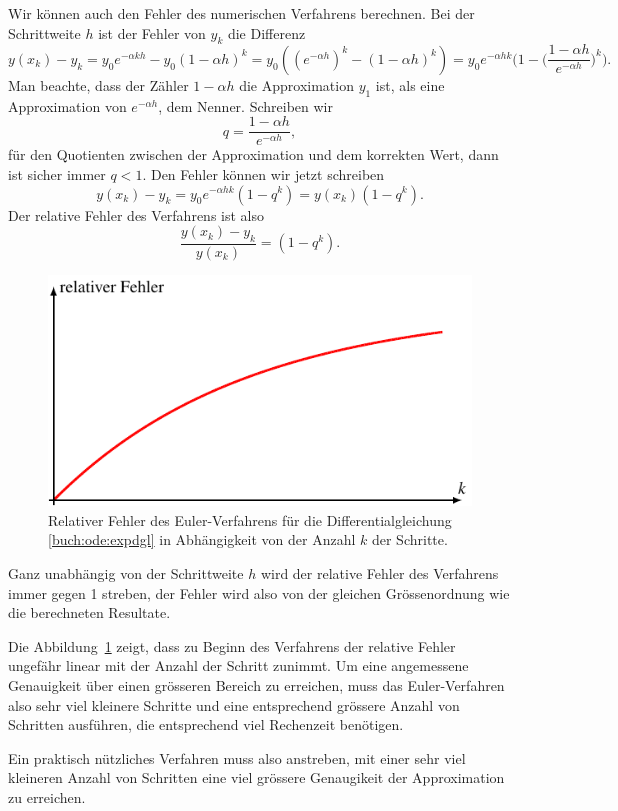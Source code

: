 Wir können auch den Fehler des numerischen Verfahrens berechnen.
Bei der Schrittweite $h$ ist der Fehler von $y_k$ die Differenz
\[
y(x_k)-y_k
=
y_0e^{-\alpha kh}-y_0(1-\alpha h)^k
=
y_0((e^{-\alpha h})^k - (1-\alpha h)^k)
=
y_0e^{-\alpha hk}\biggl(
1-\biggl(\frac{1-\alpha h}{e^{-\alpha h}}\biggr)^k
\biggr).
\]
Man beachte, dass der Zähler $1-\alpha h$ die Approximation
$y_1$ ist, als eine Approximation von $e^{-\alpha h}$, dem Nenner.
Schreiben wir
\[
q=\frac{1-\alpha h}{e^{-\alpha h}},
\]
für den Quotienten zwischen der Approximation und dem korrekten Wert,
dann ist sicher immer $q<1$.
Den Fehler können wir jetzt schreiben
\[
y(x_k)-y_k = y_0e^{-\alpha hk}(1-q^k) = y(x_k)(1-q^k).
\]
Der relative Fehler des Verfahrens ist also
\[
\frac{y(x_k)-y_k}{y(x_k)}=(1-q^k).
\]
\begin{figure}
\centering
\includegraphics{chapters/50-ode/figures/relativ.pdf}
\caption{Relativer Fehler des Euler-Verfahrens für die Differentialgleichung
\eqref{buch:ode:expdgl} in Abhängigkeit von der Anzahl $k$ der Schritte.
\label{buch:ode:relfehler}}
\end{figure}%
Ganz unabhängig von der Schrittweite $h$ wird der relative Fehler
des Verfahrens immer gegen 1 streben, der Fehler wird also von der
gleichen Grössenordnung wie die berechneten Resultate.

Die Abbildung~\ref{buch:ode:relfehler} zeigt, dass zu Beginn des Verfahrens
der relative Fehler ungefähr linear mit der Anzahl der Schritt zunimmt.
Um eine angemessene Genauigkeit über einen grösseren Bereich
zu erreichen, muss das Euler-Verfahren also sehr viel kleinere Schritte
und eine entsprechend grössere Anzahl von Schritten ausführen,
die entsprechend viel Rechenzeit benötigen.

Ein praktisch nützliches Verfahren muss also anstreben, mit einer
sehr viel kleineren Anzahl von Schritten eine viel grössere Genaugikeit
der Approximation zu erreichen.


